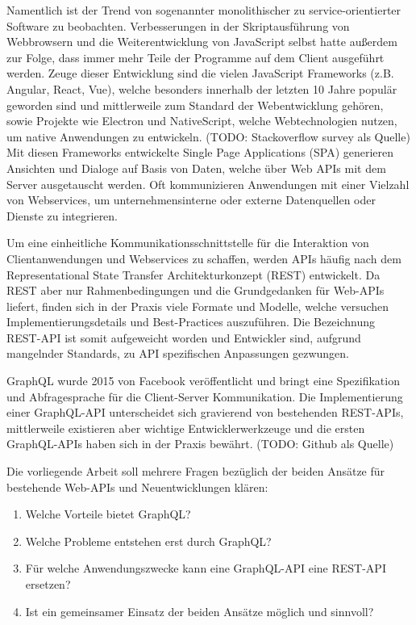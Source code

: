 Namentlich ist der Trend von sogenannter monolithischer zu service-orientierter Software zu beobachten.
Verbesserungen in der Skriptausführung von Webbrowsern und die Weiterentwicklung von JavaScript selbst hatte außerdem zur Folge, dass immer mehr Teile der Programme auf dem Client ausgeführt werden.
Zeuge dieser Entwicklung sind die vielen JavaScript Frameworks (z.B. Angular, React, Vue), welche besonders innerhalb der letzten 10 Jahre populär geworden sind und mittlerweile zum Standard der Webentwicklung gehören, sowie Projekte wie Electron und NativeScript, welche Webtechnologien nutzen, um native Anwendungen zu entwickeln. (TODO: Stackoverflow survey als Quelle)
Mit diesen Frameworks entwickelte Single Page Applications (SPA) generieren Ansichten und Dialoge auf Basis von Daten, welche über Web APIs mit dem Server ausgetauscht werden.
Oft kommunizieren Anwendungen mit einer Vielzahl von Webservices, \zB{} um unternehmensinterne oder externe Datenquellen oder Dienste zu integrieren.
\par
Um eine einheitliche Kommunikationsschnittstelle für die Interaktion von Clientanwendungen und Webservices zu schaffen, werden APIs häufig nach dem Representational State Transfer Architekturkonzept (REST) entwickelt.
Da REST aber nur Rahmenbedingungen und die Grundgedanken für Web-APIs liefert, finden sich in der Praxis viele Formate und Modelle, welche versuchen Implementierungsdetails und Best-Practices auszuführen.
Die Bezeichnung REST-API ist somit aufgeweicht worden und Entwickler sind, aufgrund mangelnder Standards, zu API spezifischen Anpassungen gezwungen.
\par
GraphQL wurde 2015 von Facebook veröffentlicht und bringt eine Spezifikation und Abfragesprache für die Client-Server Kommunikation.
Die Implementierung einer GraphQL-API unterscheidet sich gravierend von bestehenden REST-APIs, mittlerweile existieren aber wichtige Entwicklerwerkzeuge und die ersten GraphQL-APIs haben sich in der Praxis bewährt. (TODO: Github als Quelle)
\par
Die vorliegende Arbeit soll mehrere Fragen bezüglich der beiden Ansätze für bestehende Web-APIs und Neuentwicklungen klären:
\begin{enumerate}
  \item Welche Vorteile bietet GraphQL\@?
  \item Welche Probleme entstehen erst durch GraphQL\@?
  \item Für welche Anwendungszwecke kann eine GraphQL-API eine REST-API ersetzen?
  \item Ist ein gemeinsamer Einsatz der beiden Ansätze möglich und sinnvoll?
\end{enumerate}

